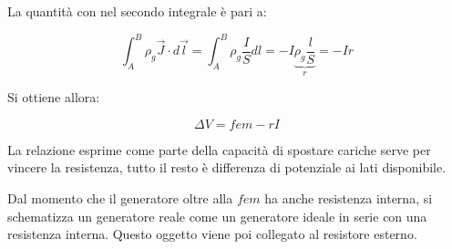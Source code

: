 La quantità con nel secondo integrale è pari a:

\[
	\int_A^B \rho_g \vec{J} \cdot d\vec{l} = \int_A^B \rho_g \frac{I}{S} dl = -I \underbrace{\rho_g\frac{l}{S}}_r = -Ir
\]

Si ottiene allora:

\[
	\boxed{\Delta V = fem - rI}
\]

La relazione esprime come parte della capacità di spostare cariche serve per vincere la resistenza, tutto il resto è differenza di potenziale ai lati disponibile.

Dal momento che il generatore oltre alla $fem$ ha anche resistenza interna, si schematizza un generatore reale come un generatore ideale in serie con una resistenza interna. Questo oggetto viene poi collegato al resistore esterno.